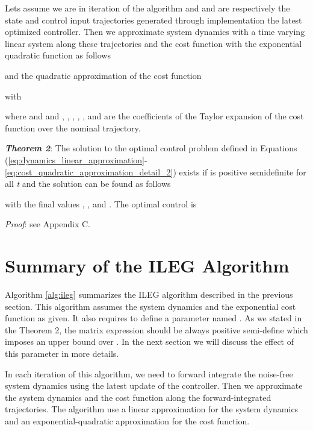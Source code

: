 \documentclass[letterpaper, 10 pt, conference]{ieeeconf}
\begin{document}
Lets assume we are in iteration  of the algorithm and  and
 are respectively the state and control input trajectories generated
through implementation the latest optimized controller. Then we approximate
system dynamics with a time varying linear system along these trajectories and
the cost function with the exponential quadratic function as follows

and the quadratic approximation of the cost function

with
 
where  and  and , , , , , and  are the coefficients of the Taylor expansion of the cost function over the nominal trajectory.

\textbf{\textit{Theorem 2}}: The solution to the optimal control problem defined in Equations\! (\ref{eq:dynamics_linear_approximation}-\ref{eq:cost_quadratic_approximation_detail_2}) exists if  is positive semidefinite for all \textit{t} and the solution can be found as follows

with the final values , , and . The optimal control is

\textit{Proof}: see Appendix C.


\section{Summary of the ILEG Algorithm}
Algorithm \ref{alg:ileg} summarizes the ILEG algorithm described in the previous
section. This algorithm assumes the system dynamics and the exponential cost
function as given. It also requires to define a parameter named . As we
stated in the Theorem 2, the matrix expression  should be always positive semi-define which
imposes an upper bound over . In the next section we will discuss the
effect of this parameter in more details.

In each iteration of this algorithm, we need to forward integrate the noise-free
system dynamics using the latest update of the controller. Then we approximate
the system dynamics and the cost function along the forward-integrated trajectories. The
algorithm use a linear approximation for the system dynamics and an
exponential-quadratic approximation for the cost function.
\end{document}
